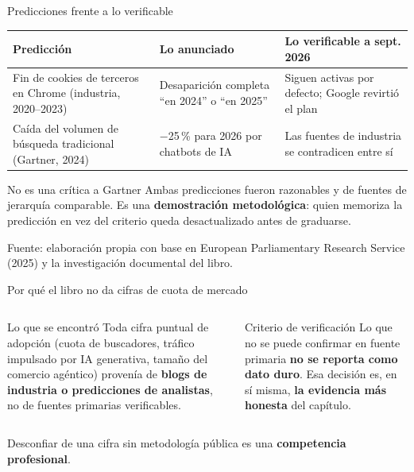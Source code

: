 \documentclass[aspectratio=169,xcolor=dvipsnames]{beamer}
\newcommand{\fuente}[1]{{\tiny\color{IPNgris}Fuente: #1}}
\begin{document}
\begin{frame}{Predicciones frente a lo verificable}
\footnotesize
\begin{center}
\begin{tabular}{@{}>{\raggedright}p{3.1cm}>{\raggedright}p{3.4cm}>{\raggedright\arraybackslash}p{4.6cm}@{}}
\toprule
\textbf{Predicción} & \textbf{Lo anunciado} & \textbf{Lo verificable a sept. 2026} \\
\midrule
Fin de cookies de terceros en Chrome (industria, 2020--2023) & Desaparición completa \enquote{en 2024} o \enquote{en 2025} & Siguen activas por defecto; Google revirtió el plan \\
Caída del volumen de búsqueda tradicional (Gartner, 2024) & $-$25\,\% para 2026 por chatbots de IA & Las fuentes de industria se contradicen entre sí \\
\bottomrule
\end{tabular}
\end{center}
\vspace{2pt}
\begin{alertblock}{No es una crítica a Gartner}
  \scriptsize Ambas predicciones fueron razonables y de fuentes de jerarquía comparable. Es una \textbf{demostración metodológica}: quien memoriza la predicción en vez del criterio queda desactualizado antes de graduarse.
\end{alertblock}
\fuente{elaboración propia con base en European Parliamentary Research Service (2025) y la investigación documental del libro.}
\end{frame}

\begin{frame}{Por qué el libro no da cifras de cuota de mercado}
\begin{columns}[T]
  \begin{block}{Lo que se encontró}
    \small Toda cifra puntual de adopción (cuota de buscadores, tráfico impulsado por IA generativa, tamaño del comercio agéntico) provenía de \textbf{blogs de industria o predicciones de analistas}, no de fuentes primarias verificables.
  \end{block}
  \begin{exampleblock}{Criterio de verificación}
    \small Lo que no se puede confirmar en fuente primaria \textbf{no se reporta como dato duro}. Esa decisión es, en sí misma, \textbf{la evidencia más honesta} del capítulo.
  \end{exampleblock}
\end{columns}
\vspace{6pt}
\begin{center}\small Desconfiar de una cifra sin metodología pública es una \textbf{competencia profesional}.\end{center}
\end{frame}
\end{document}
